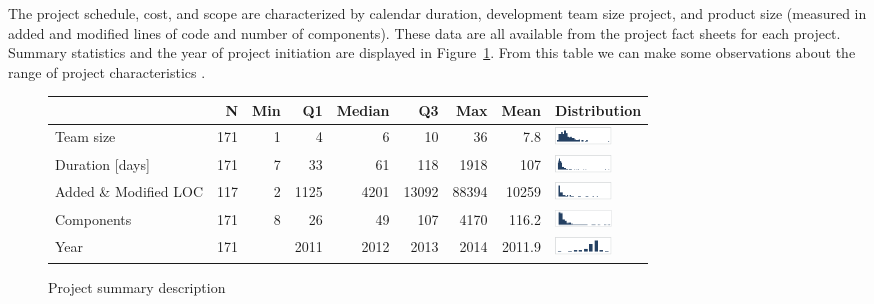 \documentclass[smallcondensed]{svjour3}
\begin{document}
 
 The project schedule, cost, and scope  are characterized by calendar duration, development team size project, and product size (measured in added and modified lines of code and number of components).  These data are all available from the project fact sheets for each project. Summary statistics and the year of project initiation are displayed in Figure~\ref{fig:Project-descriptive-stats}. From this table we can make some observations about the range of project characteristics .
 
 \begin{figure}[ht]
\scriptsize
\centering
\begin{tabular}{lrrrrrrrl}
                                                                   & N   & Min & Q1   & Median & Q3    & Max   & Mean   &  Distribution \\\hline
Team size                                                          & 171 & 1   & 4    & 6      & 10    & 36    &  7.8    &  \includegraphics[width=15mm]{img/team_size.png} \\ 
Duration {[}days{]}                                                & 171 & 7   & 33   & 61     & 118   & 1918  & 107    & \includegraphics[width=15mm]{img/duration.png} \\
Added \& Modified LOC                                                 & 117 & 2   & 1125 & 4201   & 13092 & 88394 & 10259  & \includegraphics[width=15mm]{img/LOC.png} \\
Components                                                         & 171 & 8   & 26   & 49     & 107   & 4170  & 116.2  & \includegraphics[width=15mm]{img/components.png} \\
Year                                                               & 171 &     & 2011 & 2012   & 2013  & 2014  & 2011.9 & \includegraphics[width=15mm]{img/year.png}
\end{tabular}

\caption{Project summary description}
\label{fig:Project-descriptive-stats}
\end{figure}
 
\end{document}
